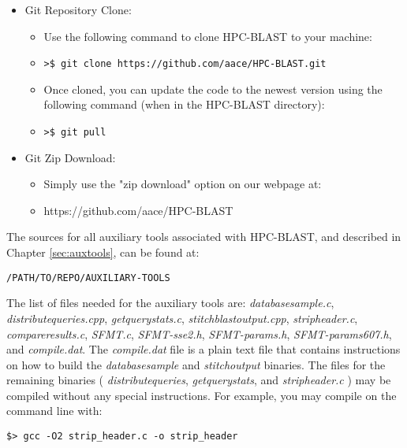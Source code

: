 \documentclass[10pt]{article}
\begin{document}
\begin{itemize}
  \item Git Repository Clone:
  \begin{itemize}
    \item Use the following command to clone HPC-BLAST to your machine:
      \item \verb|>$ git clone https://github.com/aace/HPC-BLAST.git|
      \item Once cloned, you can update the code to the newest version using the following command (when in the HPC-BLAST directory):
      \item \verb|>$ git pull|
    \end{itemize}
  \item Git Zip Download:
  \begin{itemize}
    \item  Simply use the "zip download" option on our webpage at:
    \item https://github.com/aace/HPC-BLAST
  \end{itemize}
\end{itemize}



\noindent The sources for all auxiliary tools associated with HPC-BLAST, and described in Chapter \ref{sec:auxtools}, can be found at:
\begin{verbatim}
/PATH/TO/REPO/AUXILIARY-TOOLS
\end{verbatim}

\noindent The list of files needed for the auxiliary tools are: \emph{database\textunderscore sample.c}, \emph{distribute\textunderscore queries.cpp}, \emph{get\textunderscore query\textunderscore stats.c}, \emph{stitch\textunderscore blast\textunderscore output.cpp}, \emph{strip\textunderscore header.c},
\emph{compare\textunderscore results.c}, \emph{SFMT.c}, \emph{SFMT-sse2.h}, \emph{SFMT-params.h}, \emph{SFMT-params607.h}, and \emph{compile.dat}.  The \emph{compile.dat} file is a plain text file that contains instructions on how to build the \emph{database\textunderscore sample}
and \emph{stitch\textunderscore output} binaries.  The files for the remaining binaries ( \emph{distribute\textunderscore queries},  \emph{get\textunderscore query\textunderscore stats}, and \emph{strip\textunderscore header.c} ) may be compiled without any special instructions.  For example,
you may compile on the command line with:
\begin{verbatim}
$> gcc -O2 strip_header.c -o strip_header
\end{verbatim}
\end{document}
